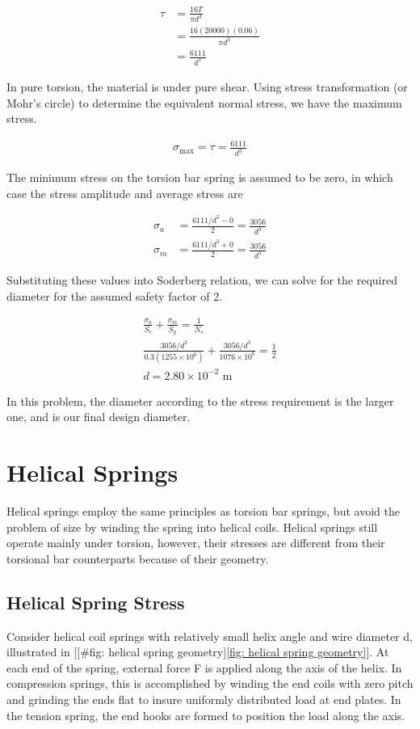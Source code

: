 \documentclass[a4paper,openany,12pt]{book}
\begin{document}
{{$$\begin{aligned}
    \tau  &= \frac{16T}{\pi d^3} \\
          &= \frac{16(20000)(0.06)}{\pi d^3} \\
          &= \frac{6111}{d^3}
  \end{aligned}$$

In pure torsion, the material is under pure shear. Using stress
transformation (or Mohr's circle) to determine the equivalent normal
stress, we have the maximum stress.

$$\begin{gathered}
    \sigma_{\max} = \tau = \frac{6111}{d^3}
  \end{gathered}$$

The minimum stress on the torsion bar spring is assumed to be zero, in
which case the stress amplitude and average stress are

$$\begin{aligned}
    \sigma_a &= \frac{6111/d^3 - 0}{2} = \frac{3056}{d^3} \\
    \sigma_m &= \frac{6111/d^3 + 0}{2} = \frac{3056}{d^3}
  \end{aligned}$$

Substituting these values into Soderberg relation, we can solve for the
required diameter for the assumed safety factor of 2.

$$\begin{gathered}
    \frac{\sigma_a}{S_e} + \frac{\sigma_m}{S_y} = \frac{1}{N_s} \\
    \frac{3056/d^3}{0.3(1255 \times 10^6)} + \frac{3056/d^3}{1076 \times 10^6} = \frac{1}{2} \\
    d = 2.80 \times 10^{-2} \text{ m}
  \end{gathered}$$

In this problem, the diameter according to the stress requirement is the
larger one, and is our final design diameter.

\section{Helical Springs}
\label{helical-springs}
Helical springs employ the same principles as torsion bar springs, but
avoid the problem of size by winding the spring into helical coils.
Helical springs still operate mainly under torsion, however, their
stresses are different from their torsional bar counterparts because of
their geometry.

\subsection{Helical Spring Stress}
\label{helical-spring-stress}
Consider helical coil springs with relatively small helix angle and wire
diameter d, illustrated in
[[\#fig: helical spring geometry]\ref{fig: helical spring geometry}]. At
each end of the spring, external force F is applied along the axis of
the helix. In compression springs, this is accomplished by winding the
end coils with zero pitch and grinding the ends flat to insure uniformly
distributed load at end plates. In the tension spring, the end hooks are
formed to position the load along the axis.


}}
\end{document}
